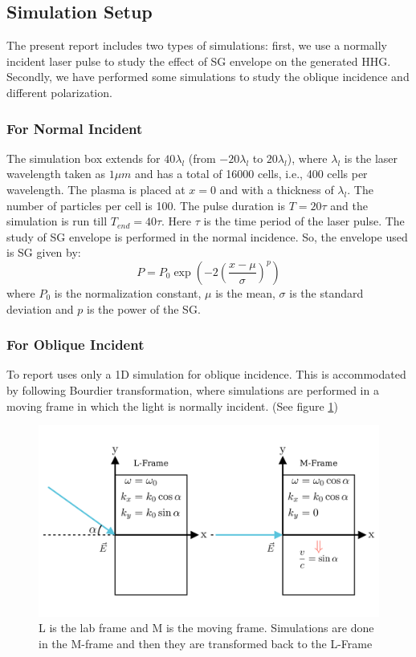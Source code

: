 \documentclass[12pt]{article}
\begin{document}
\subsection{Simulation Setup}
The present report includes two types of simulations: first, we use a normally incident laser pulse to study the effect of SG envelope on the generated HHG. Secondly, we have performed some simulations to study the oblique incidence and different polarization.
\subsubsection{For Normal Incident}
The simulation box extends for $40 \lambda _l$ (from $-20 \lambda _l$ to $20 \lambda _l$), where $\lambda_l$ is the laser wavelength taken as $1\mu m$ and has a total of 16000 cells, i.e., 400 cells per wavelength. The plasma is placed at $x=0$ and with a thickness of $\lambda_l$. The number of particles per cell is 100. The pulse duration is $T = 20 \tau$ and the simulation is run till $T_{end} = 40 \tau$. Here $\tau$ is the time period of the laser pulse. The study of SG envelope is performed in the normal incidence. So, the envelope used is SG given by:
\begin{equation}
    \label{eq:sg}
    P = P_0 \exp\left( -2 \left(\frac{x - \mu}{\sigma}\right)^p\right)
\end{equation}
where $P_0$ is the normalization constant, $\mu$ is the mean, $\sigma$ is the standard deviation and $p$ is the power of the SG.

\subsubsection{For Oblique Incident}

To report uses only a 1D simulation for oblique incidence. This is accommodated by following Bourdier transformation\cite{2d-transformation}, where simulations are performed in a moving frame in which the light is normally incident. (See figure \ref{fig:frames})

\begin{figure}[h]
    \centering
    \includegraphics[width=1\textwidth]{images/frames.png}
    \caption{L is the lab frame and M is the moving frame. Simulations are done in the M-frame and then they are transformed back to the L-Frame}
    \label{fig:frames}
\end{figure}
\end{document}
